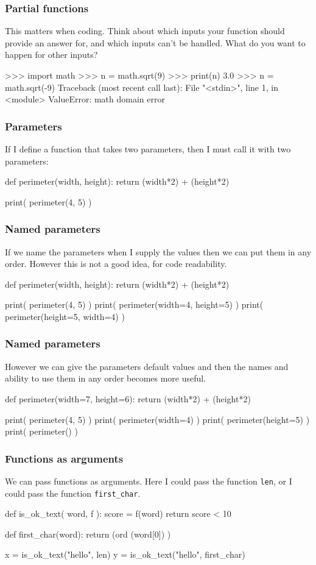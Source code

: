 \documentclass{beamer}
\begin{document}
\begin{frame}[fragile]
\frametitle{Partial functions}
This matters when coding. Think about which inputs your function
should provide an answer for, and which inputs can't be handled. What
do you want to happen for other inputs? 

\begin{code}
>>> import math
>>> n = math.sqrt(9)
>>> print(n)
3.0
>>> n = math.sqrt(-9)
Traceback (most recent call last):
  File "<stdin>", line 1, in <module>
ValueError: math domain error
\end{code}
\end{frame}

\begin{frame}[fragile]
\frametitle{Parameters}
If I define a function that takes two parameters, then I must call it
with two parameters:
\begin{code}
def perimeter(width, height):
   return (width*2) + (height*2)

print( perimeter(4, 5) )
\end{code}

\end{frame}

\begin{frame}[fragile]
\frametitle{Named parameters}
If we name the parameters when I supply the values then we can put
them in any order. However this is not a good idea, for code readability.
\begin{code}
def perimeter(width, height):
   return (width*2) + (height*2)

print( perimeter(4, 5) )
print( perimeter(width=4, height=5) )
print( perimeter(height=5, width=4) )
\end{code}
\end{frame}


\begin{frame}[fragile]
\frametitle{Named parameters}
However we can give the parameters default values and then the names
and ability to use them in any order becomes more useful.
\begin{code}
def perimeter(width=7, height=6):
   return (width*2) + (height*2)

print( perimeter(4, 5) )  
print( perimeter(width=4) )  
print( perimeter(height=5) ) 
print( perimeter() )  
\end{code}
\end{frame}






\begin{frame}[fragile]
\frametitle{Functions as arguments}
We can pass functions as arguments. Here I could pass the function \texttt{len}, or
I could pass the function \texttt{first\_char}.
\begin{code}
def is_ok_text( word, f ):
   score = f(word)
   return score < 10

def first_char(word):
   return (ord (word[0]) )

x = is_ok_text("hello", len)
y = is_ok_text("hello", first_char)
\end{code}
\end{frame}
\end{document}
